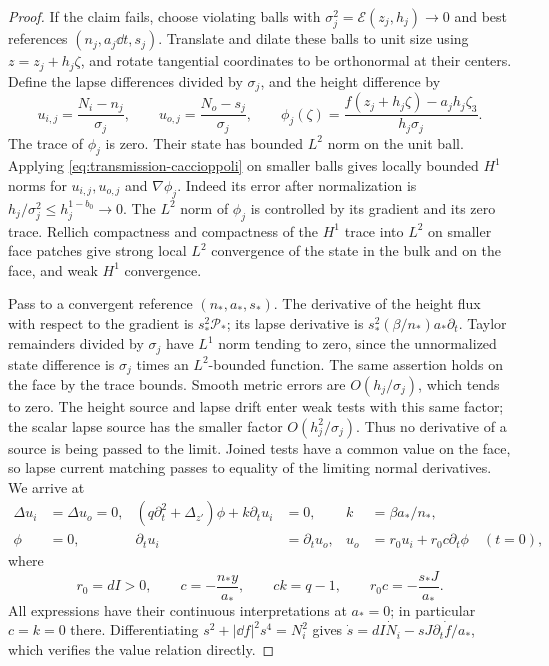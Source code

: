 \begin{proof}
If the claim fails, choose violating balls with
$\sigma_j^2=\mathcal E(z_j,h_j)\to0$ and best references
$(n_j,a_j\dd t,s_j)$.  Translate and dilate these balls to unit size
using $z=z_j+h_j\zeta$, and rotate tangential coordinates to be
orthonormal at their centers.  Define the lapse differences divided by
$\sigma_j$, and the height difference by
\begin{equation}
 u_{i,j}=\frac{N_i-n_j}{\sigma_j},\qquad
 u_{o,j}=\frac{N_o-s_j}{\sigma_j},\qquad
 \phi_j(\zeta)=
       \frac{f(z_j+h_j\zeta)-a_jh_j\zeta_3}{h_j\sigma_j}.
 \label{eq:transmission-normalized-fields}
\end{equation}
The trace of $\phi_j$ is zero.  Their state has bounded $L^2$ norm on
the unit ball.  Applying \eqref{eq:transmission-caccioppoli} on smaller
balls gives locally bounded $H^1$ norms for $u_{i,j},u_{o,j}$ and
$\nabla\phi_j$.  Indeed its error after normalization is
$h_j/\sigma_j^2\leq h_j^{1-b_0}\to0$.
The $L^2$ norm of $\phi_j$ is controlled by its gradient and its zero
trace.  Rellich compactness and compactness of the $H^1$ trace into
$L^2$ on smaller face patches give strong local $L^2$ convergence of
the state in the bulk and on the face, and weak $H^1$ convergence.

Pass to a convergent reference $(n_*,a_*,s_*)$.  The derivative of
the height flux with respect to the gradient is $s_*^2\mathcal P_*$;
its lapse derivative is $s_*^2(\beta/n_*)a_*\partial_t$.
Taylor remainders divided by $\sigma_j$ have $L^1$ norm tending to
zero, since the unnormalized state difference is $\sigma_j$ times
an $L^2$-bounded function.  The same assertion holds on the face by
the trace bounds.  Smooth metric errors are $O(h_j/\sigma_j)$,
which tends to zero.  The height source and lapse drift enter weak
tests with this same factor; the scalar lapse source has the smaller
factor $O(h_j^2/\sigma_j)$.  Thus no derivative of a source is being
passed to the limit.  Joined tests have a common value on the face,
so lapse current matching passes to equality of the limiting normal
derivatives.  We arrive at
\begin{align}
 \Delta u_i&=\Delta u_o=0,
 & (q\partial_t^2+\Delta_{z'})\phi+k\partial_tu_i&=0,
 & k&=\beta a_*/n_*,\label{eq:transmission-frozen-interior}\\
 \phi&=0,
 &\partial_tu_i&=\partial_tu_o,
 &u_o&=r_0u_i+r_0c\partial_t\phi \quad(t=0),
 \label{eq:transmission-frozen-boundary}
\end{align}
where
\begin{equation}
 r_0=dI>0,\qquad c=-\frac{n_*y}{a_*},\qquad
 ck=q-1,\qquad r_0c=-\frac{s_*J}{a_*}.
 \label{eq:transmission-frozen-relations}
\end{equation}
All expressions have their continuous interpretations at $a_*=0$;
in particular $c=k=0$ there.  Differentiating
$s^2+|\dd f|^2s^4=N_i^2$ gives
$\dot s=dI\dot N_i-sJ\partial_t\dot f/a_*$, which verifies
the value relation directly.


\end{proof}
